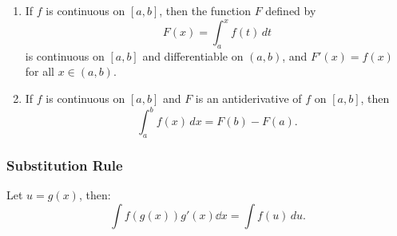 \begin{thm}
\begin{enumerate}
    \item If $f$ is continuous on $[a,b]$, then the function $F$ defined by 
    \[F(x) = \int_a^x f(t) \, dt \]
    is continuous on $[a,b]$ and differentiable on $(a,b)$, and $F'(x)=f(x)$ for all $x\in(a,b)$.
    
    \item If $f$ is continuous on $[a,b]$ and $F$ is an antiderivative of $f$ on $[a,b]$, then
    \[\int_a^b f(x) \, dx = F(b) - F(a).\]
\end{enumerate}
\end{thm}

\subsubsection{Substitution Rule}
Let $u = g(x)$, then:
\[
\int f(g(x)) g'(x) \dd x = \int f(u) \, du.
\]
